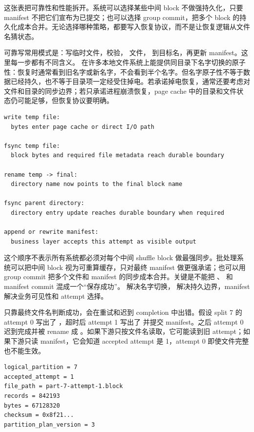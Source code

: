 这张表把可靠性和性能拆开。系统可以选择某些中间 block 不做强持久化，只要 manifest 不把它们宣布为已提交；也可以选择 group commit，把多个 block 的持久化成本合并。无论选择哪种策略，都要写入恢复协议，而不是让恢复逻辑从文件名猜状态。

可靠写常用模式是：写临时文件，校验， 文件， 到目标名，再更新 manifest。这里每一步都有不同含义。 在许多本地文件系统上能提供同目录下名字切换的原子性：恢复时通常看到旧名字或新名字，不会看到半个名字。但名字原子性不等于数据已经持久，也不等于目录项一定经受住掉电。若承诺掉电恢复，通常还要考虑对文件和目录的同步边界；若只承诺进程崩溃恢复，page cache 中的目录和文件状态仍可能足够，但恢复协议要明确。

\begin{lstlisting}[numbers=none,caption={可靠 block 写入的提交层次}]
write temp file:
  bytes enter page cache or direct I/O path

fsync temp file:
  block bytes and required file metadata reach durable boundary

rename temp -> final:
  directory name now points to the final block name

fsync parent directory:
  directory entry update reaches durable boundary when required

append or rewrite manifest:
  business layer accepts this attempt as visible output
\end{lstlisting}

这个顺序不表示所有系统都必须对每个中间 shuffle block 做最强同步。批处理系统可以把中间 block 视为可重算缓存，只对最终 manifest 做更强承诺；也可以用 group commit 把多个文件和 manifest 的同步成本合并。关键是不能把 、 和 manifest commit 混成一个“保存成功”。 解决名字切换， 解决持久边界，manifest 解决业务可见性和 attempt 选择。

只靠最终文件名判断成功，会在重试和迟到 completion 中出错。假设 split 7 的 attempt 0 写出了 ，超时后 attempt 1 写出了  并提交 manifest。之后 attempt 0 迟到完成并被 rename 成 。如果下游只按文件名读取，它可能读到旧 attempt；如果下游只读 manifest，它会知道 accepted attempt 是 1，attempt 0 即使文件完整也不能生效。

\begin{lstlisting}[numbers=none,caption={manifest 条目表达的业务事实}]
logical_partition = 7
accepted_attempt = 1
file_path = part-7-attempt-1.block
records = 842193
bytes = 67128320
checksum = 0x8f21...
partition_plan_version = 3
\end{lstlisting}

